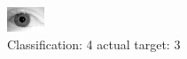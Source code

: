 \begin{figure}[h!]
\begin{center}
\includegraphics[width=0.60\columnwidth]{figures/ID2084_class_4_target_3.png}
\end{center}
\caption{ Classification: 4 actual target: 3}
\label{fig:ID2084_class_4_target_3}
\end{figure}
